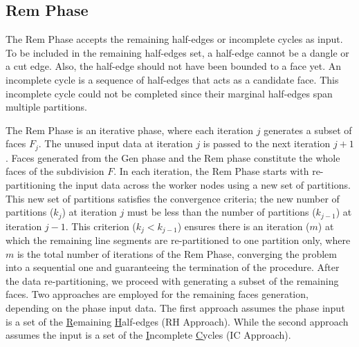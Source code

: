 \subsection{Rem Phase}
\label{sec:rem}

The Rem Phase accepts the remaining half-edges or incomplete cycles as input. 
To be included in the remaining half-edges set, a half-edge cannot be a dangle or a cut edge. Also, the half-edge should not have been bounded to a face yet.
An incomplete cycle is a sequence of half-edges that acts as a candidate face. This incomplete cycle could not be completed since their marginal half-edges span multiple partitions.


The Rem Phase is an iterative phase, where each iteration $j$ generates a subset of faces $F_j$. The unused input data at iteration $j$ is passed to the next iteration $j+1$.
Faces generated from the Gen phase and the Rem phase constitute the whole faces of the subdivision $F$.
In each iteration, the Rem Phase starts with re-partitioning the input data across the worker nodes using a new set of partitions.
This new set of partitions satisfies the convergence criteria; the new number of partitions ($k_j$) at iteration $j$ must be less than the number of partitions ($k_{j-1}$) at iteration $j-1$. This criterion ($k_j < k_{j-1}$) ensures there is an iteration ($m$) at which the remaining line segments are re-partitioned to one partition only, where $m$ is the total number of iterations of the Rem Phase, converging the problem into a sequential one and guaranteeing the termination of the procedure.
After the data re-partitioning, we proceed with generating a subset of the remaining faces. Two approaches are employed for the remaining faces generation, depending on the phase input data.
The first approach assumes the phase input is a set of the \underline{R}emaining \underline{H}alf-edges (RH Approach). 
While the second approach assumes the input is a set of the \underline{I}ncomplete \underline{C}ycles (IC Approach). 

